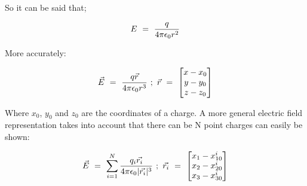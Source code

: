 \documentclass{article}
\begin{document}
So it can be said that;

\begin{equation} \label{eb-eq-10-1}
E \hspace{0.125cm} = \hspace{0.125cm} \frac{q}{4\pi \epsilon_0 r^2}
\end{equation}

More accurately:

\begin{equation} \label{eb-eq-11-1}
\vec{E} \hspace{0.125cm} = \hspace{0.125cm} \frac{q \vec{r}}{4\pi \epsilon_0 r^3} \hspace{0.125cm} ; \hspace{0.125cm} \vec{r}  \hspace{0.125cm} =  \hspace{0.125cm} \begin{bmatrix} x -  x_0 \\ y - y_0 \\ z - z_0 \end{bmatrix}
\end{equation}

Where \begin{math} x_0 \end{math}, \begin{math} y_0 \end{math} and \begin{math} z_0 \end{math} are the coordinates of a charge. A more general electric field representation takes into account that there can be N point charges can easily be shown:

\begin{equation} \label{eb-eq-12-1}
\vec{E} \hspace{0.125cm} = \hspace{0.125cm} \sum_{i=1}^{N} \frac{q_i\vec{r_i}}{4\pi \epsilon_0 |\vec{r_i}|^3} \hspace{0.125cm} ; \hspace{0.125cm} \vec{r_i}  \hspace{0.125cm} =  \hspace{0.125cm} \begin{bmatrix} x_1 -  x_{10}^{i} \\ x_2 - x_{20}^{i} \\ x_3 - x_{30}^{i} \end{bmatrix}
\end{equation}
\end{document}
